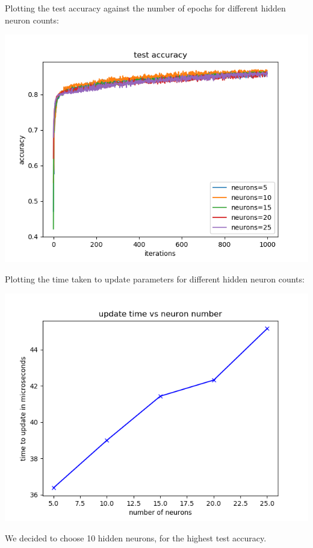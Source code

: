 Plotting the test accuracy against the number of epochs for different hidden
neuron counts:

\begin{center}
    \includegraphics[width=\imgw]{images/p1a3_neuron_accuracy.png}   
\end{center}

Plotting the time taken to update parameters for different hidden neuron counts:

\begin{center}
    \includegraphics[width=\imgw]{images/p1a3_neuron_times.png}   
\end{center}

We decided to choose 10 hidden neurons, for the highest test accuracy.

